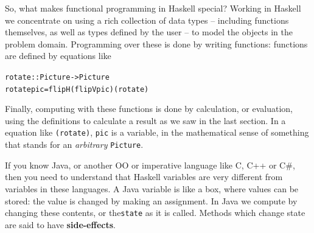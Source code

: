 So, what makes functional programming in Haskell special? Working in Haskell we concentrate on using a rich collection of data types -- including functions themselves, as well as types defined by the user -- to model the objects in the problem domain. Programming over these is done by writing functions: functions are defined by equations like
\begin{alltt}
rotate :: Picture -> Picture
rotate pic = flipH (flipV pic)\hfill\texttt{(rotate)}
\end{alltt}
Finally, computing with these functions is done by calculation, or evaluation, using the definitions to calculate a result as we saw in the last section. In a equation like \texttt{(rotate)}, \texttt{pic} is a variable, in the mathematical sense of something that stands for an \emph{arbitrary} \texttt{Picture}.

If you know Java, or another OO or imperative language like C, C++ or C\#, then you need to understand that Haskell variables are very different from variables in these languages. A Java variable is like a box, where values can be stored: the value is changed by making an assignment. In Java we compute by changing these contents, or the\texttt{state} as it is called. Methods which change state are said to have \textbf{side-effects}. 


